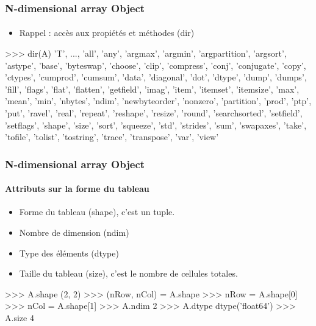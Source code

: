 \begin{frame}[fragile]
\frametitle{N-dimensional array Object}
\framesubtitle{}
\begin{itemize}
 \item Rappel : accès aux propiétés et méthodes (dir) 
\end{itemize}
\begin{pythonConsole}

>>> dir(A)
'T', ..., 'all', 'any', 'argmax', 'argmin', 'argpartition', 'argsort', 'astype',
'base', 'byteswap', 'choose', 'clip', 'compress', 'conj', 'conjugate', 'copy',
'ctypes', 'cumprod', 'cumsum', 'data', 'diagonal', 'dot', 'dtype', 'dump',
'dumps', 'fill', 'flags', 'flat', 'flatten', 'getfield', 'imag', 'item',
'itemset', 'itemsize', 'max', 'mean', 'min', 'nbytes', 'ndim', 'newbyteorder',
'nonzero', 'partition', 'prod', 'ptp', 'put', 'ravel', 'real', 'repeat',
'reshape', 'resize', 'round', 'searchsorted', 'setfield', 'setflags', 'shape',
'size', 'sort', 'squeeze', 'std', 'strides', 'sum', 'swapaxes', 'take',
'tofile', 'tolist', 'tostring', 'trace', 'transpose', 'var', 'view'
\end{pythonConsole}
\end{frame}
\begin{frame}[fragile]
\frametitle{N-dimensional array Object}
\framesubtitle{Attributs sur la forme du tableau}
\begin{itemize}
 \item Forme du tableau (shape), c'est un tuple.  
 \item Nombre de dimension (ndim)
 \item Type des éléments (dtype)
 \item Taille du tableau (size), c'est le nombre de cellules totales. 
\end{itemize}
\begin{pythonConsole}
>>> A.shape
(2, 2)
>>> (nRow, nCol) = A.shape
>>> nRow = A.shape[0]
>>> nCol = A.shape[1]
>>> A.ndim
2
>>> A.dtype
dtype('float64')
>>> A.size
4
\end{pythonConsole}
\end{frame}
